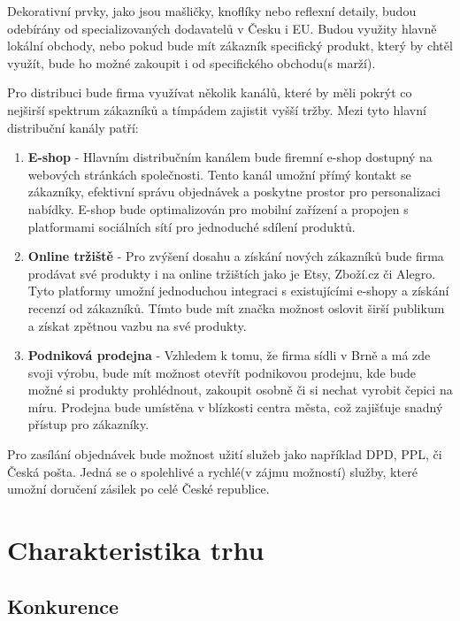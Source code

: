 \documentclass[12pt, a4paper]{article}
\begin{document}
Dekorativní prvky, jako jsou mašličky, knoflíky nebo reflexní detaily, budou odebírány od specializovaných dodavatelů v Česku i EU.
Budou využity hlavně lokální obchody, nebo pokud bude mít zákazník specifický produkt, který by chtěl využít,
bude ho možné zakoupit i od specifického obchodu(s marží).

\vspace{20pt}
\noindent Pro distribuci bude firma využívat několik kanálů, které by měli pokrýt co nejširší spektrum zákazníků a tímpádem
zajistit vyšší tržby. Mezi tyto hlavní distribuční kanály patří:

\begin{enumerate}
  \item \textbf{E-shop} -
  Hlavním distribučním kanálem bude firemní e-shop dostupný na webových stránkách společnosti. 
  Tento kanál umožní přímý kontakt se zákazníky, efektivní správu objednávek a poskytne prostor pro personalizaci nabídky. 
  E-shop bude optimalizován pro mobilní zařízení a propojen s platformami sociálních sítí pro jednoduché sdílení produktů.
  \item \textbf{Online tržiště} -
  Pro zvýšení dosahu a získání nových zákazníků bude firma prodávat své produkty i na online tržištích jako je Etsy, Zboží.cz či Alegro.
  Tyto platformy umožní jednoduchou integraci s existujícími e-shopy a získání recenzí od zákazníků.
  Tímto bude mít značka možnost oslovit širší publikum a získat zpětnou vazbu na své produkty.
  \item \textbf{Podniková prodejna} -
  Vzhledem k tomu, že firma sídli v Brně a má zde svoji výrobu, bude mít možnost otevřít podnikovou prodejnu, kde bude možné si produkty prohlédnout, zakoupit osobně
  či si nechat vyrobit čepici na míru. Prodejna bude umístěna v blízkosti centra města, což zajišťuje snadný přístup pro zákazníky.
\end{enumerate}

Pro zasílání objednávek bude možnost užití služeb jako například DPD, PPL, či Česká pošta.
Jedná se o spolehlivé a rychlé(v zájmu možností) služby, které umožní doručení zásilek po celé České republice.

\pagebreak

\section{Charakteristika trhu}
\subsection{Konkurence}
\end{document}
